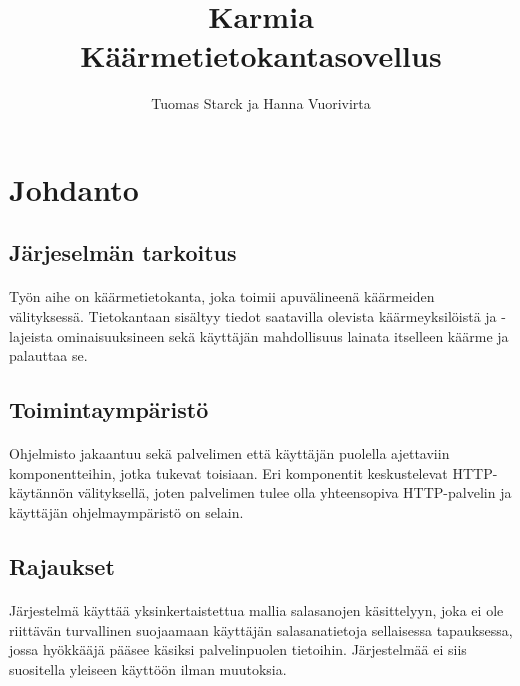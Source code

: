 \documentclass[11pt]{article}
\begin{document}
\title{\Huge{\bf Karmia} \\ \large{Käärmetietokantasovellus}}
\author{Tuomas Starck ja Hanna Vuorivirta}
\maketitle

\vspace{4em}

\section{Johdanto}

\subsection{Järjeselmän tarkoitus}

\paragraph{} Työn aihe on käärmetietokanta, joka toimii apuvälineenä käärmeiden välityksessä. Tietokantaan sisältyy tiedot saatavilla olevista käärmeyksilöistä ja -lajeista ominaisuuksineen sekä käyttäjän mahdollisuus lainata itselleen käärme ja palauttaa se.

\subsection{Toimintaympäristö}

\paragraph{} Ohjelmisto jakaantuu sekä palvelimen että käyttäjän puolella ajettaviin komponentteihin, jotka tukevat toisiaan. Eri komponentit keskustelevat HTTP-käytännön välityksellä, joten palvelimen tulee olla yhteensopiva HTTP-palvelin ja käyttäjän ohjelmaympäristö on selain.

\subsection{Rajaukset}

\paragraph{} Järjestelmä käyttää yksinkertaistettua mallia salasanojen käsittelyyn, joka ei ole riittävän turvallinen suojaamaan käyttäjän salasanatietoja sellaisessa tapauksessa, jossa hyökkääjä pääsee käsiksi palvelinpuolen tietoihin. Järjestelmää ei siis suositella yleiseen käyttöön ilman muutoksia.
\end{document}
